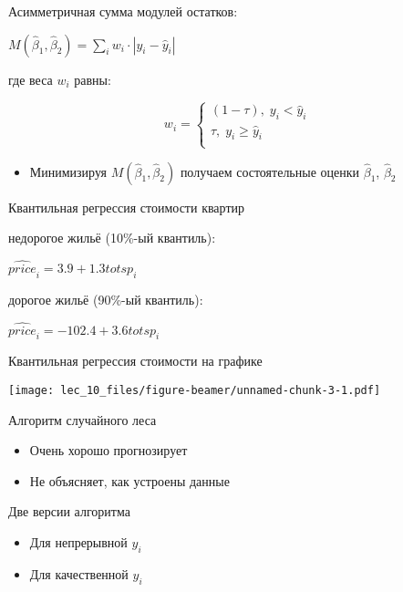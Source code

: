 \documentclass[ignorenonframetext,]{beamer}
\newcommand{\hy}{\hat{y}}
\newcommand{\hb}{\hat{\beta}}
\begin{document}
\begin{frame}{Асимметричная сумма модулей остатков:}

\(M(\hb_1,\hb_2)=\sum_i w_i \cdot |y_i - \hy_i|\)

где веса \(w_i\) равны:

\[
w_i=\begin{cases}
(1-\tau), \; y_i < \hy_i \\
\tau, \; y_i \geq \hy_i \\
\end{cases}
\]

\begin{itemize}
\itemsep1pt\parskip0pt
\item
  Минимизируя \(M(\hb_1,\hb_2)\) получаем состоятельные оценки
  \(\hb_1\), \(\hb_2\)
\end{itemize}

\end{frame}

\begin{frame}{Квантильная регрессия стоимости квартир}

недорогое жильё (10\%-ый квантиль):

\(\widehat{price}_i = 3.9 + 1.3 totsp_i\)

дорогое жильё (90\%-ый квантиль):

\(\widehat{price}_i = -102.4 + 3.6 totsp_i\)

\end{frame}

\begin{frame}{Квантильная регрессия стоимости на графике}

\texttt{[image: lec\_10\_files/figure-beamer/unnamed-chunk-3-1.pdf]}

\end{frame}

\begin{frame}{Алгоритм случайного леса}

\begin{itemize}
\item
  Очень хорошо прогнозирует
\item
  Не объясняет, как устроены данные
\end{itemize}

\end{frame}

\begin{frame}{Две версии алгоритма}

\begin{itemize}
\item
  Для непрерывной \(y_i\)
\item
  Для качественной \(y_i\)
\end{itemize}

\end{frame}
\end{document}
